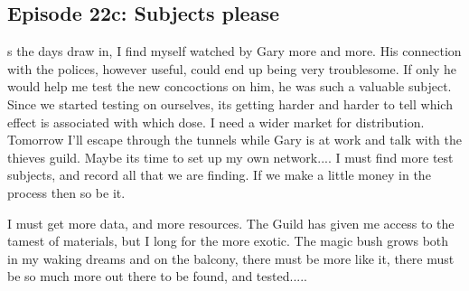 \subsection{Episode 22c: Subjects please}

s the days draw in, I find myself watched by Gary more and more. His connection with the polices, however useful, could end up being very troublesome. If only he would help me test the new concoctions on him, he was such a valuable subject. Since we started testing on ourselves, its getting harder and harder to tell which effect is associated with which dose. I need a wider market for distribution. Tomorrow I'll escape through the tunnels while Gary is at work and talk with the thieves guild. Maybe its time to set up my own network.... I must find more test subjects, and record all that we are finding. If we make a little money in the process then so be it.\medskip

I must get more data, and more resources. The Guild has given me access to the tamest of materials, but I long for the more exotic. The magic bush grows both in my waking dreams and on the balcony, there must be more like it, there must be so much more out there to be found, and tested.....\medskip

\vspace*{5mm}
